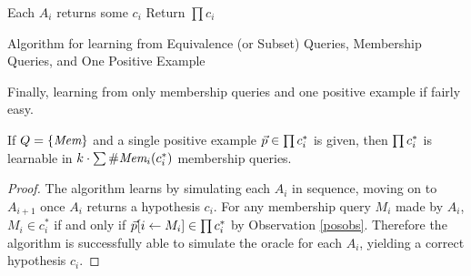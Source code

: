 \begin{algorithm}[H]
\label{lineqalg}
\SetAlgoLined
{}
Each $A_i$ returns some $c_i$\;
Return $\prod c_i$\;
\caption{Algorithm for learning from Equivalence (or Subset)  Queries, Membership Queries, and One Positive Example}
\end{algorithm}


Finally, learning from only membership queries and one positive example if fairly easy. 

\begin{proposition}
If $Q = \{\emph{Mem}\}$ and a single positive example $\vec{p} \in \prod c^*_i$ is given, then $\prod c^*_i$ is learnable in $k \cdot \sum \#\emph{Mem}_{i}(c^*_i)$ membership queries. 
\end{proposition}
\begin{proof}
The algorithm learns by simulating each $A_i$ in sequence, moving on to $A_{i+1}$ once $A_i$ returns a hypothesis $c_i$. 
For any membership query $M_i$ made by $A_i$, $M_i \in c^*_i$ if and only if $\vec{p}[i \leftarrow M_i]\in \prod c^*_i$ by Observation \ref{posobs}. 
Therefore the algorithm is successfully able to simulate the oracle for each $A_i$, yielding a correct hypothesis $c_i$. 
\end{proof}
